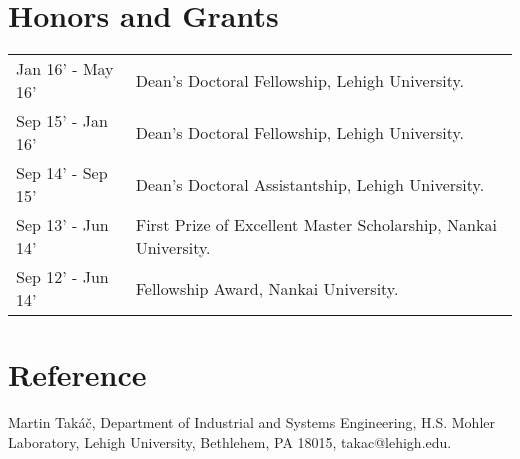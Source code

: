 \documentclass[a4paper,11pt]{article} %
\begin{document}
\section{Honors and Grants}
\begin{longtable}{>{\centering}p{3.3cm}|p{14cm}}
   Jan 16' - May 16' & Dean’s Doctoral Fellowship, Lehigh University.\\
   Sep 15' - Jan 16' & Dean’s Doctoral Fellowship, Lehigh University.\\
   Sep 14' - Sep 15' & Dean’s Doctoral Assistantship, Lehigh University.\\
   Sep 13' - Jun 14' & First Prize of Excellent Master Scholarship, Nankai University.\\
   Sep 12' - Jun 14' & Fellowship Award, Nankai University.\\
\end{longtable}


\section{Reference}
Martin Takáč, Department of Industrial and Systems Engineering, H.S. Mohler Laboratory, Lehigh University, Bethlehem, PA 18015, takac@lehigh.edu.
\end{document}
